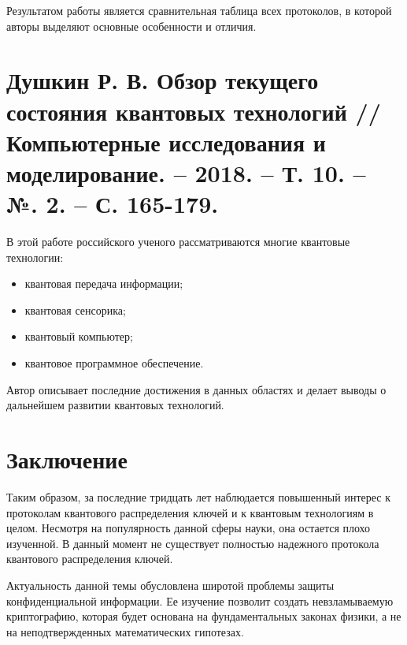 Результатом работы является сравнительная таблица всех протоколов, в которой авторы выделяют основные особенности и отличия.

\section{Душкин Р. В. Обзор текущего состояния квантовых технологий //Компьютерные исследования и моделирование. – 2018. – Т. 10. – №. 2. – С. 165-179.}
В этой работе \cite{dushkin2018obzor} российского ученого рассматриваются многие квантовые технологии:
\begin{itemize}
	\item квантовая передача информации;
	\item квантовая сенсорика;
	\item квантовый компьютер;
	\item квантовое программное обеспечение.
\end{itemize}
Автор описывает последние достижения в данных областях и делает выводы о дальнейшем развитии квантовых технологий.






\clearpage

\section*{Заключение}
\thispagestyle{empty}
Таким образом, за последние тридцать лет наблюдается повышенный интерес к протоколам квантового распределения ключей и к квантовым технологиям в целом. Несмотря на популярность данной сферы науки, она остается плохо изученной. В данный момент не существует полностью надежного протокола квантового распределения ключей.

Актуальность данной темы обусловлена широтой проблемы защиты конфиденциальной информации. Ее изучение позволит создать невзламываемую криптографию, которая будет основана на фундаментальных законах физики, а не на неподтвержденных математических гипотезах.




